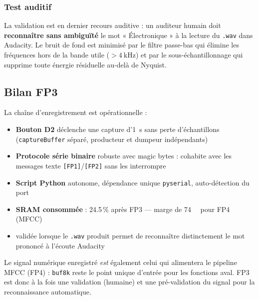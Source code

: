 
\subsubsection{Test auditif}

La validation  est en dernier recours auditive : un auditeur humain doit \textbf{reconnaître sans ambiguïté} le mot « Électronique » à la lecture du \verb|.wav| dans Audacity. Le bruit de fond est minimisé par le filtre passe-bas qui élimine les fréquences hors de la bande utile ($>\SI{4}{\kilo\hertz}$) et par le sous-échantillonnage qui supprime toute énergie résiduelle au-delà de Nyquist.

\subsection{Bilan FP3}

La chaîne d'enregistrement est opérationnelle :
\begin{itemize}
    \item \textbf{Bouton D2} déclenche une capture d'1~\si{\second} sans perte d'échantillons (\texttt{captureBuffer} séparé, producteur et dumpeur indépendants)
    \item \textbf{Protocole série binaire} robuste avec magic bytes : cohabite avec les messages texte \texttt{[FP1]}/\texttt{[FP2]} sans les interrompre
    \item \textbf{Script Python} autonome, dépendance unique \verb|pyserial|, auto-détection du port
    \item \textbf{SRAM consommée} : 24.5\,\% après FP3 --- marge de \SI{74}{\kibi\byte} pour FP4 (MFCC)
    \item \textbf{} validée lorsque le \texttt{.wav} produit permet de reconnaître distinctement le mot prononcé à l'écoute Audacity
\end{itemize}

Le signal numérique enregistré \emph{est} également celui qui alimentera le pipeline MFCC (FP4) : \texttt{buf8k} reste le point unique d'entrée pour les fonctions aval. FP3 est donc à la fois une validation (humaine) et une pré-validation du signal pour la reconnaissance automatique.

\newpage
